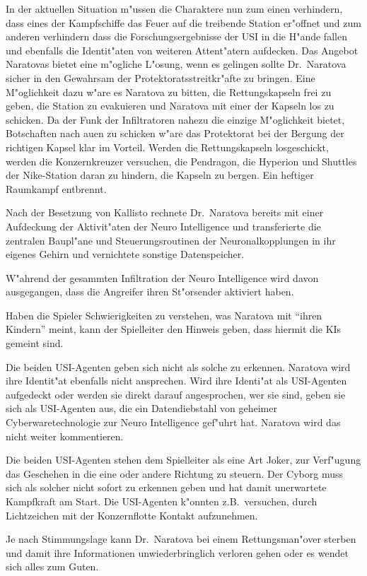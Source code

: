 In der aktuellen Situation m"ussen die Charaktere nun zum einen verhindern, dass eines der Kampfschiffe das Feuer auf die treibende Station er"offnet und zum anderen verhindern dass die Forschungsergebnisse der USI in die H"ande fallen und ebenfalls die Identit"aten von weiteren Attent"atern aufdecken. Das Angebot Naratovas bietet eine m"ogliche L"osung, wenn es gelingen sollte Dr.~Naratova sicher in den Gewahrsam der Protektoratsstreitkr"afte zu bringen. Eine M"oglichkeit dazu w"are es Naratova zu bitten, die Rettungskapseln frei zu geben, die Station zu evakuieren und Naratova mit einer der Kapseln los zu schicken. Da der Funk der Infiltratoren nahezu die einzige M"oglichkeit bietet, Botschaften nach au\3en zu schicken w"are das Protektorat bei der Bergung der richtigen Kapsel klar im Vorteil. Werden die Rettungskapseln losgeschickt, werden die Konzernkreuzer versuchen, die Pendragon, die Hyperion und Shuttles der Nike-Station daran zu hindern, die Kapseln zu bergen. Ein heftiger Raumkampf entbrennt.

\begin{remarks}
Nach der Besetzung von Kallisto rechnete Dr.~Naratova bereits mit einer Aufdeckung der Aktivit"aten der Neuro Intelligence und transferierte die zentralen Baupl"ane und Steuerungsroutinen der Neuronalkopplungen in ihr eigenes Gehirn und vernichtete sonstige Datenspeicher.

W"ahrend der gesammten Infiltration der Neuro Intelligence wird davon ausgegangen, dass die Angreifer ihren St"orsender aktiviert haben.

Haben die Spieler Schwierigkeiten zu verstehen, was Naratova mit "`ihren Kindern"' meint, kann der Spielleiter den Hinweis geben, dass hiermit die KIs gemeint sind.

Die beiden USI-Agenten geben sich nicht als solche zu erkennen. Naratova wird ihre Identit"at ebenfalls nicht ansprechen. Wird ihre Identi"at als USI-Agenten aufgedeckt oder werden sie direkt darauf angesprochen, wer sie sind, geben sie sich als USI-Agenten aus, die ein Datendiebstahl von geheimer Cyberwaretechnologie zur Neuro Intelligence gef"uhrt hat. Naratova wird das nicht weiter kommentieren.

Die beiden USI-Agenten stehen dem Spielleiter als eine Art Joker, zur Verf"ugung das Geschehen in die eine oder andere Richtung zu steuern. Der Cyborg muss sich als solcher nicht sofort zu erkennen geben und hat damit unerwartete Kampfkraft am Start. Die USI-Agenten k"onnten z.B.~versuchen, durch Lichtzeichen mit der Konzernflotte Kontakt aufzunehmen.

Je nach Stimmungslage kann Dr.~Naratova bei einem Rettungsman"over sterben und damit ihre Informationen unwiederbringlich verloren gehen oder es wendet sich alles zum Guten.
\end{remarks}